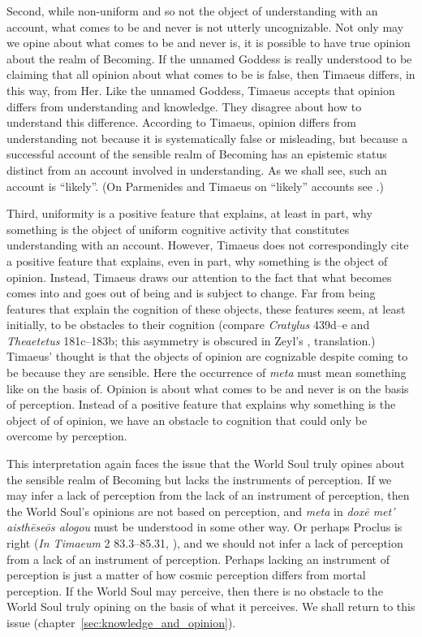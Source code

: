 Second, while non-uniform and so not the object of understanding with an account, what comes to be and never is not utterly uncognizable. Not only may we opine about what comes to be and never is, it is possible to have true opinion about the realm of Becoming. If the unnamed Goddess is really understood to be claiming that all opinion about what comes to be is false, then Timaeus differs, in this way, from Her. Like the unnamed Goddess, Timaeus accepts that opinion differs from understanding and knowledge. They disagree about how to understand this difference. According to Timaeus, opinion differs from understanding not because it is systematically false or misleading, but because a successful account of the sensible realm of Becoming has an epistemic status distinct from an account involved in understanding. As we shall see, such an account is ``likely''. (On Parmenides and Timaeus on ``likely'' accounts see \citealt{Bryan:2012bt}.)

Third, uniformity is a positive feature that explains, at least in part, why something is the object of uniform cognitive activity that constitutes understanding with an account. However, Timaeus does not correspondingly cite a positive feature that explains, even in part, why something is the object of opinion. Instead, Timaeus draws our attention to the fact that what becomes comes into and goes out of being and is subject to change. Far from being features that explain the cognition of these objects, these features seem, at least initially, to be obstacles to their cognition (compare \emph{Cratylus} 439d–e and \emph{Theaetetus} 181c–183b; this asymmetry is obscured in Zeyl's \citeyear[13]{Zeyl:2000cs}, translation.) Timaeus' thought is that the objects of opinion are cognizable despite coming to be because they are sensible. Here the occurrence of \emph{meta} must mean something like on the basis of. Opinion is about what comes to be and never is on the basis of perception. Instead of a positive feature that explains why something is the object of of opinion, we have an obstacle to cognition that could only be overcome by perception.

This interpretation again faces the issue that the World Soul truly opines about the sensible realm of Becoming but lacks the instruments of perception. If we may infer a lack of perception from the lack of an instrument of perception, then the World Soul's opinions are not based on perception, and \emph{meta} in \emph{doxē met’ aisthēseōs alogou} must be understood in some other way. Or perhaps Proclus is right (\emph{In Timaeum} 2 83.3–85.31, \citealt{Diehl:1903re}), and we should not infer a lack of perception from a lack of an instrument of perception. Perhaps lacking an instrument of perception is just a matter of how cosmic perception differs from mortal perception. If the World Soul may perceive, then there is no obstacle to the World Soul truly opining on the basis of what it perceives. We shall return to this issue (chapter~\ref{sec:knowledge_and_opinion}).

